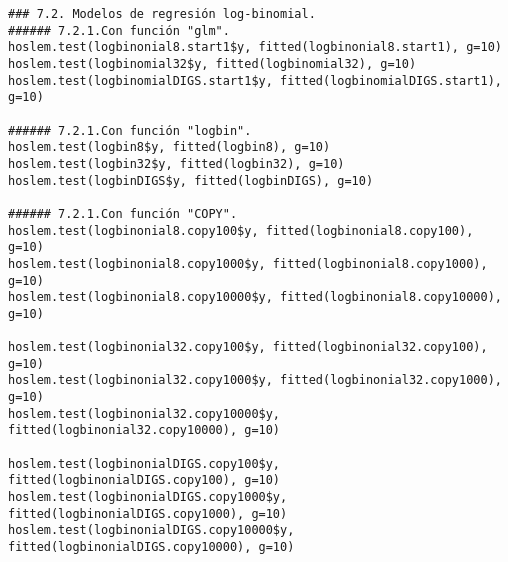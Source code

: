 \begin{Verbatim}
### 7.2. Modelos de regresión log-binomial.
###### 7.2.1.Con función "glm".
hoslem.test(logbinonial8.start1$y, fitted(logbinonial8.start1), g=10)
hoslem.test(logbinomial32$y, fitted(logbinomial32), g=10)
hoslem.test(logbinomialDIGS.start1$y, fitted(logbinomialDIGS.start1), g=10)

###### 7.2.1.Con función "logbin".
hoslem.test(logbin8$y, fitted(logbin8), g=10) 
hoslem.test(logbin32$y, fitted(logbin32), g=10)
hoslem.test(logbinDIGS$y, fitted(logbinDIGS), g=10)

###### 7.2.1.Con función "COPY".
hoslem.test(logbinonial8.copy100$y, fitted(logbinonial8.copy100), g=10)
hoslem.test(logbinonial8.copy1000$y, fitted(logbinonial8.copy1000), g=10)
hoslem.test(logbinonial8.copy10000$y, fitted(logbinonial8.copy10000), g=10)

hoslem.test(logbinonial32.copy100$y, fitted(logbinonial32.copy100), g=10)
hoslem.test(logbinonial32.copy1000$y, fitted(logbinonial32.copy1000), g=10)
hoslem.test(logbinonial32.copy10000$y, fitted(logbinonial32.copy10000), g=10)

hoslem.test(logbinonialDIGS.copy100$y, fitted(logbinonialDIGS.copy100), g=10)
hoslem.test(logbinonialDIGS.copy1000$y, fitted(logbinonialDIGS.copy1000), g=10)
hoslem.test(logbinonialDIGS.copy10000$y, fitted(logbinonialDIGS.copy10000), g=10)
\end{Verbatim}